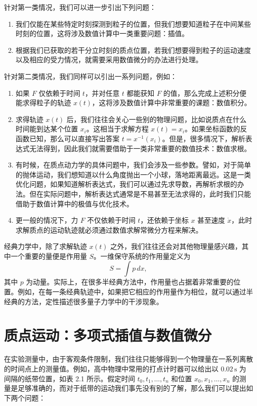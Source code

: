 针对第一类情况，我们可以进一步引出下列问题：
\begin{enumerate}
\item 我们仅能在某些特定时刻探测到粒子的位置，但我们想要知道粒子在中间某些时刻的位置，这将涉及数值计算中一类重要问题：插值。
\item 根据我们已获取的若干分立时刻的质点位置，若我们想要得到粒子的运动速度以及相应的受力情况，就需要采用数值微分的办法进行处理。
\end{enumerate}
针对第二类情况，我们同样可以引出一系列问题，例如：
\begin{enumerate}
\item 如果 $F$ 仅依赖于时间 $t$，并对任意 $t$ 都能获知 $F$ 的值，那么完成上述积分便能求得粒子的轨迹 $x(t)$，这将涉及数值计算中非常重要的课题：数值积分。
\item 求得轨迹 $x(t)$ 后，我们往往会关心一些别的物理问题，比如说质点在什么时间能到达某个位置 $x_i$。这相当于求解方程 $x(t)=x_i$。如果坐标函数的反函数已知，那么可以直接写出答案 $t=x^{-1}(x_i)$。但是，很多情况下，解析表达式无法得到，因此我们就需要借助于一类非常重要的数值技术：数值求根。
\item 有时候，在质点动力学的具体问题中，我们会涉及一些参数。譬如，对于简单的抛体运动，我们想知道以什么角度抛出一个小球，落地距离最远。这是一类优化问题，如果知道解析表达式，我们可以通过先求导数，再解析求根的办法。但在实际问题中，解析表达式通常是不易甚至无法求得的，此时我们只能借助于数值计算中的极值与优化技术。
\item 更一般的情况下，力 $F$ 不仅依赖于时间 $t$，还依赖于坐标 $x$ 甚至速度 $\dot{x}$，此时求解质点的运动轨迹就必须通过数值求解常微分方程来解决。
\end{enumerate}

经典力学中，除了求解轨迹 $x(t)$ 之外，我们往往还会对其他物理量感兴趣，其中一个重要的量便是作用量 $S$。一维保守系统的作用量定义为
\begin{equation}
 S=\int p\,dx,
\tag{2.0.2}
\end{equation}
其中 $p$ 为动量。实际上，在很多半经典方法中，作用量也占据着非常重要的位置。例如，在每一条经典轨迹中，如果把它相应的作用量作为相位，就可以通过半经典的方法，定性描述很多量子力学中的干涉现象。

\section{质点运动：多项式插值与数值微分}

在实验测量中，由于客观条件限制，我们往往只能够得到一个物理量在一系列离散的时间点上的测量值。例如，高中物理中常用的打点计时器可以给出以 $0.02\,\mathrm{s}$ 为间隔的纸带位置，如表 2.1 所示。假定时间 $t_0,t_1,\ldots,t_n$ 和位置 $x_0,x_1,\ldots,x_n$ 的测量是足够准确的，而对于纸带的运动我们事先没有别的了解，那么我们可以提出如下两个问题：

